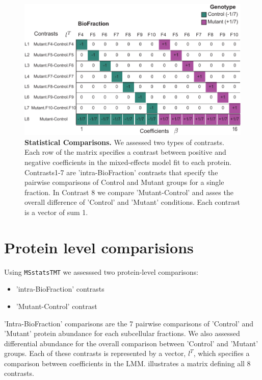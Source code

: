 \documentclass[11pt]{elife}\usepackage[]{graphicx}\usepackage[]{color}
\begin{document}
\begin{figure}[ht!] %
  \begin{fullwidth}
  \begin{center}
	  \includegraphics[width=0.9\paperwidth,keepaspectratio]{contrasts}
	  \caption{\textbf{Statistical Comparisons.} We assessed two types of
	  contrasts. Each row of the matrix specifies a contrast between
	  positive and negative coefficients in the mixed-effects model fit to
	  each protein. Contrasts1-7 are 'intra-BioFraction' contrasts that
	  specify the pairwise comparisons of Control and Mutant groups for a
	  single fraction. In Contrast 8 we compare 'Mutant-Control' and asses
	  the overall difference of 'Control' and 'Mutant' conditions.  Each
	  contrast is a vector of sum 1.}
	  \label{fig:contrasts}
  \end{center}
  \end{fullwidth}
\end{figure}


\section{Protein level comparisions}

Using \texttt{MSstatsTMT} we assesssed two protein-level comparisons:

\begin{itemize}
	\item 'intra-BioFraction' contrasts 
	\item 'Mutant-Control' contrast 
\end{itemize}



'Intra-BioFraction' comparisons are the 7 pairwise comparisons of 'Control' and
'Mutant' protein abundance for each subcellular fractions. We
also assessed differential abundance for the overall comparison between 'Control'
and 'Mutant' groups. Each of these contrasts is represented by a vector, $l^T$, 
which specifies a comparison between coefficients in the LMM. 
illustrates a matrix defining all 8 contrasts. 
\end{document}

